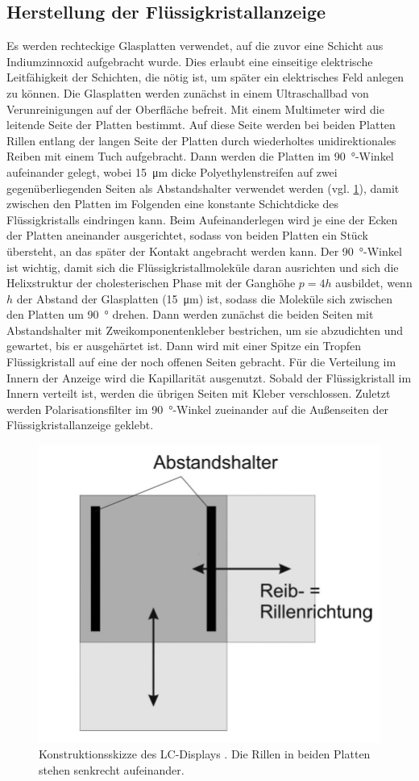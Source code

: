 \documentclass[
	a4paper,
	12pt,
	pagesize,
	ngerman
]{scrartcl}
\begin{document}
	\subsection{Herstellung der Flüssigkristallanzeige}
	Es werden rechteckige Glasplatten verwendet, auf die zuvor eine Schicht aus Indiumzinnoxid aufgebracht wurde.
	Dies erlaubt eine einseitige elektrische Leitfähigkeit der Schichten, die nötig ist, um später ein elektrisches Feld anlegen zu können.
	Die Glasplatten werden zunächst in einem Ultraschallbad von Verunreinigungen auf der Oberfläche befreit.
	Mit einem Multimeter wird die leitende Seite der Platten bestimmt.
	Auf diese Seite werden bei beiden Platten Rillen entlang der langen Seite der Platten durch wiederholtes unidirektionales Reiben mit einem Tuch aufgebracht.
	Dann werden die Platten im \SI{90}{\degree}-Winkel aufeinander gelegt, wobei \SI{15}{\micro \meter} dicke Polyethylenstreifen auf zwei gegenüberliegenden Seiten als Abstandshalter verwendet werden (vgl. \cref{fig_ohnestern}), damit zwischen den Platten im Folgenden eine konstante Schichtdicke des Flüssigkristalls eindringen kann.
	Beim Aufeinanderlegen wird je eine der Ecken der Platten aneinander ausgerichtet, sodass von beiden Platten ein Stück übersteht, an das später der Kontakt angebracht werden kann.
	Der \SI{90}{\degree}-Winkel ist wichtig, damit sich die Flüssigkristallmoleküle daran ausrichten und sich die Helixstruktur der cholesterischen Phase mit der Ganghöhe $p=4h$ ausbildet, wenn $h$ der Abstand der Glasplatten (\SI{15}{\micro \meter}) ist, sodass die Moleküle sich zwischen den Platten um \SI{90}{\degree} drehen.
	Dann werden zunächst die beiden Seiten mit Abstandshalter mit Zweikomponentenkleber bestrichen, um sie abzudichten und gewartet, bis er ausgehärtet ist.
	Dann wird mit einer Spitze ein Tropfen Flüssigkristall auf eine der noch offenen Seiten gebracht. Für die Verteilung im Innern der Anzeige wird die Kapillarität ausgenutzt.
  Sobald der Flüssigkristall im Innern verteilt ist, werden die übrigen Seiten mit Kleber verschlossen.
	Zuletzt werden Polarisationsfilter im \SI{90}{\degree}-Winkel zueinander auf die Außenseiten der Flüssigkristallanzeige geklebt.

	\begin{figure}[H]
			\includegraphics[width=0.5\linewidth]{images/ohnestern.PNG}
			\caption{
			Konstruktionsskizze des LC-Displays \cite{imp08}. Die Rillen in beiden Platten stehen senkrecht aufeinander.
			}
			\label{fig_ohnestern}
	\end{figure}
\end{document}
